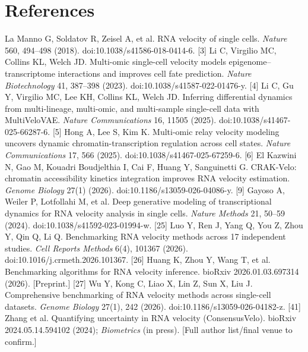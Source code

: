 \documentclass[10pt,twocolumn]{article}
\begin{document}
\section*{References}
{\scriptsize\noindent [1] La Manno G, Soldatov R, Zeisel A, et al. RNA velocity of single cells. \emph{Nature} 560, 494--498 (2018). doi:10.1038/s41586-018-0414-6. [3] Li C, Virgilio MC, Collins KL, Welch JD. Multi-omic single-cell velocity models epigenome--transcriptome interactions and improves cell fate prediction. \emph{Nature Biotechnology} 41, 387--398 (2023). doi:10.1038/s41587-022-01476-y. [4] Li C, Gu Y, Virgilio MC, Lee KH, Collins KL, Welch JD. Inferring differential dynamics from multi-lineage, multi-omic, and multi-sample single-cell data with MultiVeloVAE. \emph{Nature Communications} 16, 11505 (2025). doi:10.1038/s41467-025-66287-6. [5] Hong A, Lee S, Kim K. Multi-omic relay velocity modeling uncovers dynamic chromatin-transcription regulation across cell states. \emph{Nature Communications} 17, 566 (2025). doi:10.1038/s41467-025-67259-6. [6] El Kazwini N, Gao M, Kouadri Boudjelthia I, Cai F, Huang Y, Sanguinetti G. CRAK-Velo: chromatin accessibility kinetics integration improves RNA velocity estimation. \emph{Genome Biology} 27(1) (2026). doi:10.1186/s13059-026-04086-y. [9] Gayoso A, Weiler P, Lotfollahi M, et al. Deep generative modeling of transcriptional dynamics for RNA velocity analysis in single cells. \emph{Nature Methods} 21, 50--59 (2024). doi:10.1038/s41592-023-01994-w. [25] Luo Y, Ren J, Yang Q, You Z, Zhou Y, Qin Q, Li Q. Benchmarking RNA velocity methods across 17 independent studies. \emph{Cell Reports Methods} 6(4), 101367 (2026). doi:10.1016/j.crmeth.2026.101367. [26] Huang K, Zhou Y, Wang T, et al. Benchmarking algorithms for RNA velocity inference. bioRxiv 2026.01.03.697314 (2026). [Preprint.] [27] Wu Y, Kong C, Liao X, Lin Z, Sun X, Liu J. Comprehensive benchmarking of RNA velocity methods across single-cell datasets. \emph{Genome Biology} 27(1), 242 (2026). doi:10.1186/s13059-026-04182-z. [41] Zhang et al. Quantifying uncertainty in RNA velocity (ConsensusVelo). bioRxiv 2024.05.14.594102 (2024); \emph{Biometrics} (in press). [Full author list/final venue to confirm.]\par}
\end{document}
